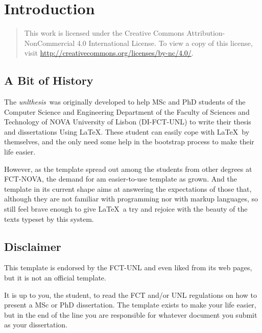 \newcommand{\unlthesis}{\emph{unlthesis}}
\newcommand{\unlthesisclass}{\texttt{unlthesis.cls}}


\chapter{Introduction}
\label{cha:introduction}

\begin{quote}
  This work is licensed under the Creative Commons Attribution-NonCommercial 4.0 International License.
  To view a copy of this license, visit \url{http://creativecommons.org/licenses/by-nc/4.0/}.
\end{quote}

\section{A Bit of History} %
\label{sec:a_bit_of_history}

The \unlthesis\ was originally developed to help MSc and PhD students of the Computer Science and Engineering Department of the Faculty of Sciences and Technology of NOVA University of Lisbon (DI-FCT-UNL) to write their thesis and dissertations Using \LaTeX.
%
These student can easily cope with \LaTeX\ by themselves, and the only need some help in the bootstrap process to make their life easier.

However, as the template spread out among the students from other degrees at FCT-NOVA, the demand for am easier-to-use template as grown.
%
And the template in its current shape aims at answering the expectations of those that, although they are not familiar with programming nor with markup languages, so still feel brave enough to give \LaTeX\ a try and rejoice with the beauty of the texts typeset by this system.



\section{Disclaimer} %
\label{sec:disclaimer}

This template is endorsed by the FCT-UNL and even liked from its web pages, but it is not an official template.

It is up to you, the student, to read the FCT and/or UNL regulations on how to present a MSc or PhD dissertation.  The template exists to make your life easier, but in the end of the line you are responsible for whatever document you submit as your dissertation.

